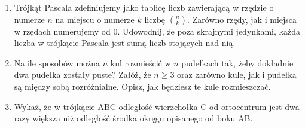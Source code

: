 \documentclass[10pt]{article}
\begin{document}
\begin{enumerate}
  \item Trójkąt Pascala zdefiniujemy jako tablicę liczb zawierającą w rzędzie o numerze \(n\) na miejscu o numerze \(k\) liczbę \(\binom{n}{k}\). Zarówno rzędy, jak i miejsca w rzędach numerujemy od 0. Udowodnij, że poza skrajnymi jedynkami, każda liczba w trójkącie Pascala jest sumą liczb stojących nad nią.
  \item Na ile sposobów można \(n\) kul rozmieścić w \(n\) pudełkach tak, żeby dokładnie dwa pudełka zostały puste? Załóż, że \(n \geq 3\) oraz zarówno kule, jak i pudełka są między sobą rozróżnialne. Opisz, jak będziesz te kule rozmieszczać.
  \item Wykaż, że w trójkącie ABC odległość wierzchołka C od ortocentrum jest dwa razy większa niż odległość środka okręgu opisanego od boku AB.
\end{enumerate}
\end{document}
